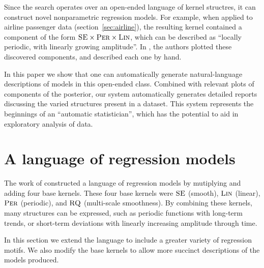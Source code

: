 \documentclass{article}
\begin{document}
Since the search operates over an open-ended language of kernel structres, it can construct novel nonparametric regression models.
For example, when applied to airline passenger data (section~\ref{sec:airline}), the resulting kernel contained a component of the form ${\textsc{SE}} \times {\textsc{Per}} \times {\textsc{Lin}}$, which can be described as ``locally periodic, with linearly growing amplitude''.
In \citep{DuvLloGroetal13}, the authors plotted these discovered components, and described each one by hand.

In this paper we show that one can automatically generate natural-language descriptions of \gp{} models in this open-ended class.
Combined with relevant plots of components of the posterior, our system automatically generates detailed reports discussing the varied structures present in a dataset.
This system represents the beginnings of an ``automatic statistician'', which has the potential to aid in exploratory analysis of data.

%

\section{A language of regression models}
\label{sec:improvements}

The work of \cite{DuvLloGroetal13} constructed a language of regression models by mutiplying and adding four base kernels.
These four base kernels were ${\textsc{SE}}$ (smooth), ${\textsc{Lin}}$ (linear), ${\textsc{Per}}$ (periodic), and ${\textsc{RQ}}$ (multi-scale smoothness).
By combining these kernels, many structures can be expressed, such as periodic functions with long-term trends, or short-term deviations with linearly increasing amplitude through time.

In this section we extend the language to include a greater variety of regression motifs.
We also modify the base kernels to allow more succinct descriptions of the models produced.
\end{document}

